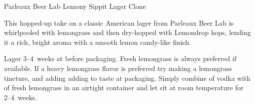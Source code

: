 \stylesection{\styleamericanlager}

\begin{recipie}{Parleaux Beer Lab Lemony Sippit Lager Clone}

\begin{aboutblock}
This hopped-up take on a classic American lager from Parleaux Beer Lab is
whirlpooled with lemongrass and then dry-hopped with Lemondrop hops, lending it
a rich, bright aroma with a smooth lemon candy-like finish. \sourceaha
\end{aboutblock}


\begin{methodandtiming}
  
\begin{mashsteps}
\end{mashsteps}

\begin{fermentationsteps}
\end{fermentationsteps}

\begin{directions}
Lager 3--4~weeks at  before packaging. Fresh lemongrass is always
preferred if available. If a heavy lemongrass flavor is preferred try making
a lemongrass tincture, and adding adding to taste at packaging. Simply combine
 of vodka with  of fresh lemongrass in an airtight container
and let sit at room temperature for 2--4~weeks.
\end{directions}

\end{methodandtiming}

\pagebreak

\begin{ingredientsblock}

\begin{malts}
\end{malts}

\begin{hops}
\end{hops}


\end{ingredientsblock}

\end{recipie}

